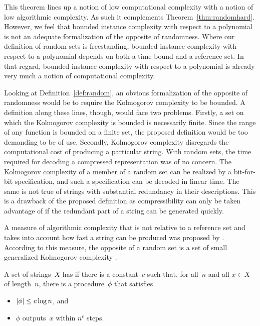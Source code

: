 This theorem lines up a notion of low computational complexity with a notion of low algorithmic complexity.
As such it complements Theorem~\ref{thm:randomhard}.
However, we feel that bounded instance complexity with respect to a polynomial is not an adequate formalization of the opposite of randomness.
Where our definition of random sets is freestanding, bounded instance complexity with respect to a polynomial depends on both a time bound and a reference set.
In that regard, bounded instance complexity with respect to a polynomial is already very much a notion of computational complexity.

Looking at Definition~\ref{def:random}, an obvious formalization of the opposite of randomness would be to require the Kolmogorov complexity to be bounded.
A definition along these lines, though, would face two problems.
Firstly, a set on which the Kolmogorov complexity is bounded is necessarily finite.
Since the range of any function is bounded on a finite set, the proposed definition would be too demanding to be of use.
Secondly, Kolmogorov complexity disregards the computational cost of producing a particular string.
With random sets, the time required for decoding a compressed representation was of no concern.
The Kolmogorov complexity of a member of a random set can be realized by a bit-for-bit specification, and such a specification can be decoded in linear time.
The same is not true of strings with substantial redundancy in their descriptions.
This is a drawback of the proposed definition as compressibility can only be taken advantage of if the redundant part of a string can be generated quickly.

A measure of algorithmic complexity that is not relative to a reference set and takes into account how fast a string can be produced was proposed by \textcite{hartmanis1983generalized}.
According to this measure, the opposite of a random set is a set of small generalized Kolmogorov complexity \parencite{balcazar1986sets,allender1988p-printable}.
\begin{definition}
  A set of strings~$X$ has  if there is a constant~$c$ such that, for all~$n$ and all $x \in X$ of length~$n$, there is a procedure~$\phi$ that satisfies
  \begin{itemize}
  \item ${\lvert\phi\rvert} \le c\log n$, and
  \item $\phi$ outputs~$x$ within $n^c$ steps.
  \end{itemize}
\end{definition}

